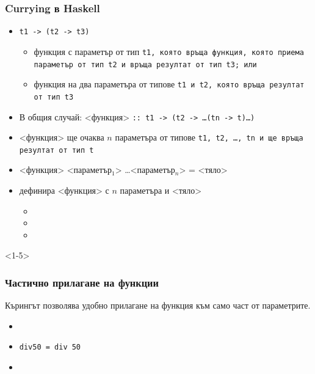 \documentclass[alsotrans,beameroptions={aspectratio=169}]{beamerswitch}
\begin{document}
\begin{frame}[fragile]
  \frametitle{Currying в Haskell}

  \begin{itemize}[<+->]
  \item \tt{t1 \alert{->} (t2 \alert{->} t3)}
    \begin{itemize}
    \item функция с параметър от тип \tt{t1}, която връща функция, която приема параметър от тип \tt{t2} и връща резултат от тип \tt{t3}; или
    \item функция на два параметъра от типове \tt{t1} и \tt{t2}, която връща резултат от тип \tt{t3}
    \end{itemize}
  \item В общия случай: <функция> \tt{\alert{::} t1 \alert{->} (t2 \alert{->}} \ldots \tt{(tn \alert{->} t)}\ldots\tt)
  \item{} <функция> ще очаква $n$ параметъра от типове \tt{t1}, \tt{t2}, \ldots, \tt{tn} и ще връща резултат от тип \tt{t}
  \item{} <функция> <параметър$_1$> \ldots <параметър$_n$> \tta= <тяло>
  \item дефинира <функция> с $n$ параметъра и <тяло>
    \begin{itemize}
    \item {}
    \item {}
    \item {}
    \end{itemize}
  \end{itemize}
\end{frame}

\begin{frame}<1-5>

  \frametitle{Частично прилагане на функции}
  Кърингът позволява удобно прилагане на функция към само част от параметрите.
  \begin{itemize}[<+->]
  \item {}
  \item \tt{div50\temporal<4>{ x}{ $\!\!\not{\tt x}$}{} = div 50}
  \item {}
  \end{itemize}
\end{frame}
\end{document}
